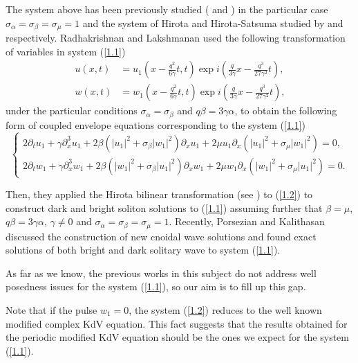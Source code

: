 \documentclass[reqno]{amsart}
\numberwithin{equation}{section}
\begin{document}
The system above has been previously studied (\cite{28} and
\cite{39}) in the particular case
$\sigma_{\alpha}=\sigma_{\beta}=\sigma_{\mu}=1$ and the system of
Hirota and Hirota-Satsuma studied by \cite{2} and \cite{1}
respectively. Radhakrishnan and Lakshmanan \cite{33} used the
following transformation of variables in system (\ref{1.1})
\begin{align*}
u(x,t)  &  =u_{1}\left(  x-\frac{q^{2}}{6\gamma}t,t\right)  \exp
i\left(
\frac{q}{3\gamma}x-\frac{q^{3}}{27\gamma^{2}}t\right), \\
w(x,t)  &  =w_{1}\left(  x-\frac{q^{2}}{6\gamma}t,t\right)  \exp
i\left(
\frac{q}{3\gamma}x-\frac{q^{3}}{27\gamma^{2}}t\right)  \text{,}\end{align*}
under the particular conditions $\sigma_{\alpha}=\sigma_{\beta}$ and
$q\beta =3\gamma\alpha$, to obtain the following form of coupled
envelope equations
corresponding to the system (\ref{1.1})
\begin{equation}\label{1.2}
\begin{cases}
2\partial_{t}u_1\!+\!\gamma\partial_{x}^{3}u_{1}\!+\! 2\beta\left(|u_1|^{2}\!+
\!\sigma_{\beta}|w_1|^{2}\right)
\partial_{x}u_1\!+\!2\mu u_{1}\partial_{x}(|u_1|^2\!+\!\sigma_{\mu}|w_1|^2)\!=\!0,\\
2\partial_{t}w_{1}\!+\!\gamma\partial_{x}^{3}w_{1}\!+\!2\beta\left(|w_1| ^{2}\!+
\!\sigma_{\beta}|u_1|^2\right)
\partial_{x}w_{1}\!+\!2\mu w_{1}\partial_{x}(|w_1|^2\!+\!\sigma_{\mu}|u_1|^2)\!=\!0.
\end{cases}
\end{equation}

Then, they applied the Hirota bilinear transformation (see \cite{17}) to
(\ref{1.2}) to construct dark and bright soliton solutions to (\ref{1.1})
assuming further that $\beta=\mu$, $q\beta=3\gamma\alpha$, $\gamma\neq0$ and
$\sigma_{\alpha}=\sigma_{\beta}=\sigma_{\mu}=1$. Recently,
Porsezian and Kalithasan \cite{32} discussed the construction of
new cnoidal wave solutions and found exact solutions of both bright
and dark solitary wave to system (\ref{1.1}).

As far as we know, the previous works in this subject do not
address well posedness issues for the system (\ref{1.1}), so our
aim is to fill up this gap.

Note that if the pulse
 $w_{1}=0$, the system (\ref{1.2}) reduces to the well known
 modified complex KdV equation. This fact suggests that the results obtained
 for the periodic modified
 KdV equation should be the ones we expect for the system (\ref{1.1}).
\end{document}
